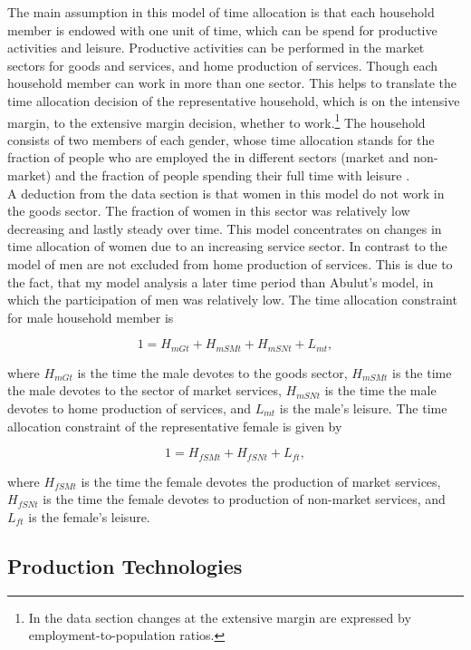 \documentclass[a4paper,12pt]{article}
\begin{document}
The main assumption in this model of time allocation is that each household member is endowed with one unit of time, which can be spend for productive activities and leisure. Productive activities can be performed in the market sectors for goods and services, and home production of services. Though each household member can work in more than one sector. This helps to translate the time allocation decision of the representative household, which is on the intensive margin, to the extensive margin decision, whether to work.\footnote{In the data section changes at the extensive margin are expressed by employment-to-population ratios.} The household consists of two members of each gender, whose time allocation stands for the fraction of people who are employed the in different sectors (market and non-market) and the fraction of people spending their full time with leisure \citep{Akbulut:11}.\\
A deduction from the data section is that women in this model do not work in the goods sector. The fraction of women in this sector was relatively low decreasing and lastly steady over time. This model concentrates on changes in time allocation of women due to an increasing service sector. In contrast to the model of \citet{Akbulut:11} men are not excluded from home production of services. This is due to the fact, that my model analysis a later time period than Abulut's model, in which the participation of men was relatively low. The time allocation constraint for male household member is 

\begin{equation}
\label{Hm}
	1=  H_{mGt} + H_{mSMt} + H_{mSNt} + L_{mt},
\end{equation}

where $H_{mGt}$ is the time the male devotes to the goods sector, $H_{mSMt}$ is the time the male devotes to the sector of market services, $H_{mSNt}$ is the time the male devotes to home production of services, and $L_{mt}$ is the male's leisure. The time allocation constraint of the representative female is given by

\begin{equation}\label{Hf}
	1=  H_{fSMt} + H_{fSNt} +L_{ft},
\end{equation}

where $H_{fSMt}$ is the time the female devotes the production of market services, $H_{fSNt}$ is the time the female devotes to production of non-market services, and $L_{ft}$ is the female's leisure.

\subsection{Production Technologies}
\end{document}
